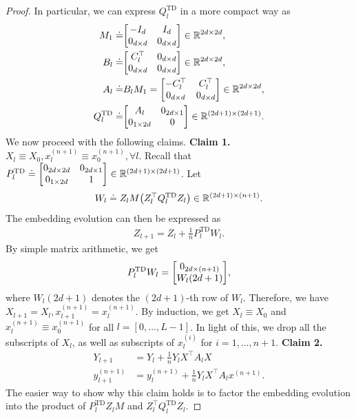 \documentclass{article}
\newcommand{\R}{\mathbb{R}}
\newcommand{\td}{\text{TD}}
\begin{document}
\begin{proof}
    In particular,
    we can express $Q_l^{\td}$ in a more compact way as
\begin{align}
  M_1 \doteq& \mqty[-I_{d} & I_{d} \\0_{d \times d} & 0_{d \times d}] \in \R^{2d \times 2d}, \label{eq:M_1 define}\\
  B_l \doteq& \mqty[C_l^\top & 0_{d\times d} \\ 0_{d \times d} & 0_{d \times d}] \in \R^{2d \times 2d},\\
  A_l \doteq& B_l M_1  = \mqty[-C_l^\top & C_l^\top \\ 0_{d \times d} & 0_{d \times d}] \in \R^{2d \times 2d},\\
  Q_l^{\td} \doteq& \mqty[A_l & 0_{2d \times 1} \\ 0_{1 \times 2d} & 0] \in \R^{(2d + 1) \times (2d+1)}.
\end{align}
We now proceed with the following claims.
    \textbf{Claim 1. $X_l \equiv X_0 , x_l^{(n+1)} \equiv x_0^{(n+1)}, \forall l.$}
    Recall that $ P_l^{\td} \doteq \mqty[0_{2d \times 2d} & 0_{2d \times 1} \\ 0_{1 \times 2d} & 1]
    \in \R^{(2d+1) \times (2d+1)}$.
    Let
    \begin{align}
        W_l \doteq Z_l M \qty(Z_l^\top Q_l^{\td} Z_l) \in \R^{(2d+1) \times (n+1)}.
    \end{align}
    The embedding evolution can then be expressed as
    \begin{align}
        Z_{l+1} = Z_l + \frac{1}{n} P_l^{\td} W_l.
    \end{align}
    By simple matrix arithmetic, we get
    \begin{align}
        P_l^{\td} W_l = \mqty[0_{2d \times (n+1)}\\
                        W_l(2d+1)],
    \end{align}
    where $W_l(2d+1)$ denotes the $(2d + 1)$-th row of $W_l$.
    Therefore, we have $X_{l+1} = X_l, x_{l+1}^{(n+1)} = x_l^{(n+1)}$.
    By induction, we get $X_l \equiv X_0$ and $x_l^{(n+1)} \equiv x_0^{(n+1)}$ for all $l = [0,\dots,L-1]$.
    In light of this,
    we drop all the subscripts of $X_l$,
    as well as subscripts of $x_l^{(i)}$ for $i=1,\dots, n+1$.
    \textbf{Claim 2.}
    \begin{align}
        Y_{l+1} &= Y_l + \frac{1}{n} Y_l X^\top A_l X\\
        y_{l+1}^{(n+1)} &= y_l^{(n+1)} + \frac{1}{n} Y_l X^\top A_l x^{(n+1)}.
    \end{align}
    The easier way to show why this claim holds is to factor the embedding evolution into the product of $P_l^{\td} Z_l M$ and $Z_l^\top Q_l^{\td} Z_l$.

\end{proof}
\end{document}

